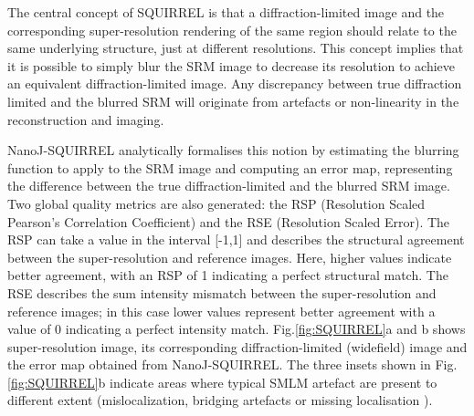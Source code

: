 The central concept of SQUIRREL is that a diffraction-limited image and the corresponding super-resolution rendering of the same region should relate to the same underlying structure, just at different resolutions. This concept implies that it is possible to simply blur the SRM image to decrease its resolution to achieve an equivalent diffraction-limited image. Any discrepancy between true diffraction limited and the blurred SRM will originate from artefacts or non-linearity in the reconstruction and imaging.

NanoJ-SQUIRREL analytically formalises this notion by estimating the blurring function to apply to the SRM image and computing an error map, representing the difference between the true diffraction-limited and the blurred SRM image. Two global quality metrics are also generated: the RSP (Resolution Scaled Pearson’s Correlation Coefficient) and the RSE (Resolution Scaled Error). The RSP can take a value in the interval [-1,1] and describes the structural agreement between the super-resolution and reference images. Here, higher values indicate better agreement, with an RSP of 1 indicating a perfect structural match. The RSE describes the sum intensity mismatch between the super-resolution and reference images; in this case lower values represent better agreement with a value of 0 indicating a perfect intensity match. Fig.\ref{fig:SQUIRREL}a and b shows super-resolution image, its corresponding diffraction-limited (widefield) image and the error map obtained from NanoJ-SQUIRREL. The three insets shown in Fig.\ref{fig:SQUIRREL}b indicate areas where typical SMLM artefact are present to different extent (mislocalization, bridging artefacts or missing localisation \cite{waldchen2015light}). 



